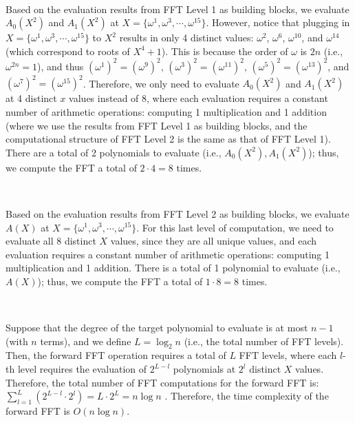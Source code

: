 $ $

 Based on the evaluation results from FFT Level 1 as building blocks, we evaluate $A_{0}(X^2)$ and $A_{1}(X^2)$ at $X = \{\omega^1, \omega^3, \cdots, \omega^{15}\}$. However, notice that plugging in $X = \{\omega^1, \omega^3, \cdots, \omega^{15}\}$ to $X^2$ results in only 4 distinct values: $\omega^2$, $\omega^6$, $\omega^{10}$, and $\omega^{14}$ (which correspond to roots of $X^4+1$). This is because the order of $\omega$ is $2n$ (i.e., $\omega^{2n} = 1$), and thus $(\omega^1)^2 = (\omega^9)^2$, $(\omega^3)^2 = (\omega^{11})^2$, $(\omega^5)^2 = (\omega^{13})^2$, and $(\omega^7)^2 = (\omega^{15})^2$. Therefore, we only need to evaluate $A_{0}(X^2)$ and $A_{1}(X^2)$ at 4 distinct $x$ values instead of 8, where each evaluation requires a constant number of arithmetic operations: computing 1 multiplication and 1 addition (where we use the results from FFT Level 1 as building blocks, and the computational structure of FFT Level 2 is the same as that of FFT Level 1). There are a total of 2 polynomials to evaluate (i.e., $A_{0}(X^2), A_{1}(X^2)$); thus, we compute the FFT a total of $2 \cdot 4 = 8$ times. 

$ $

 Based on the evaluation results from FFT Level 2 as building blocks, we evaluate $A(X)$ at $X = \{\omega^1, \omega^3, \cdots, \omega^{15}\}$. For this last level of computation, we need to evaluate all 8 distinct $X$ values, since they are all unique values, and each evaluation requires a constant number of arithmetic operations: computing 1 multiplication and 1 addition. There is a total of 1 polynomial to evaluate (i.e., $A(X)$); thus, we compute the FFT a total of $1 \cdot 8 = 8$ times. 

$ $

 Suppose that the degree of the target polynomial to evaluate is at most $n-1$ (with $n$ terms), and we define $L = \log_2 n$ (i.e., the total number of FFT levels). Then, the forward FFT operation requires a total of $L$ FFT levels, where each $l$-th level requires the evaluation of $2^{L - l}$ polynomials at $2^l$ distinct $X$ values. Therefore, the total number of FFT computations for the forward FFT is: $\sum_{l=1}^{L}(2^{L-l} \cdot 2^l) = L \cdot 2^L = n \log n$
. Therefore, the time complexity of the forward FFT is $O(n \log n)$.



